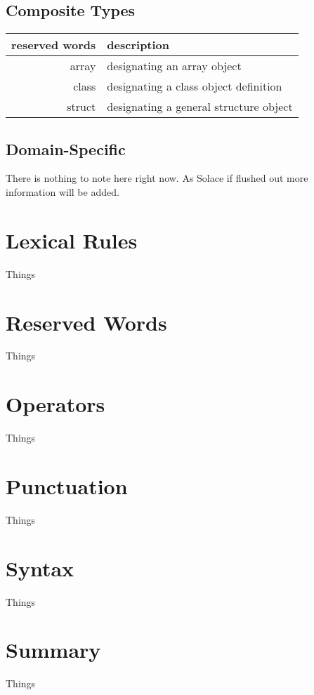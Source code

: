 \documentclass{article}
\begin{document}
\subsection{Composite Types}
\begin{tabular}{r|l}
	reserved words & description \\
	\hline
	\hline
	array & designating an array object \\
	class & designating a class object definition \\
	struct & designating a general structure object
\end{tabular}

\subsection{Domain-Specific}
There is nothing to note here right now. As Solace if flushed out more information will be added.


\section{Lexical Rules}
Things


\section{Reserved Words}
Things


\section{Operators}
Things

\section{Punctuation}
Things


\section{Syntax}
Things


\section{Summary}
Things
\end{document}
